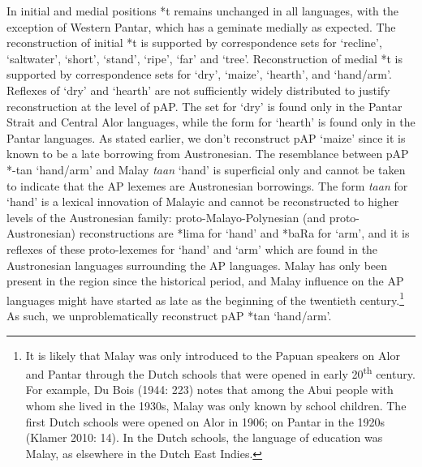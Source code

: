 In initial and medial positions *t remains unchanged in all languages, with the exception of Western Pantar, which has a geminate medially as expected. The reconstruction of initial *t is supported by correspondence sets for {\textquoteleft}recline{\textquoteright}, {\textquoteleft}saltwater{\textquoteright}, {\textquoteleft}short{\textquoteright}, {\textquoteleft}stand{\textquoteright}, {\textquoteleft}ripe{\textquoteright}, {\textquoteleft}far{\textquoteright} and {\textquoteleft}tree{\textquoteright}. Reconstruction of medial *t is supported by correspondence sets for {\textquoteleft}dry{\textquoteright}, {\textquoteleft}maize{\textquoteright}, {\textquoteleft}hearth{\textquoteright}, and {\textquoteleft}hand/arm{\textquoteright}. Reflexes of {\textquoteleft}dry{\textquoteright} and {\textquoteleft}hearth{\textquoteright} are not sufficiently widely distributed to justify reconstruction at the level of pAP. The set for {\textquoteleft}dry{\textquoteright} is found only in the Pantar Strait and Central 
Alor languages, while the form for {\textquoteleft}hearth{\textquoteright} is found only in the Pantar languages. As stated earlier, we don{\textquoteright}t reconstruct pAP {\textquoteleft}maize{\textquoteright} since it is known to be a late borrowing from Austronesian. The resemblance between pAP *-tan {\textquoteleft}hand/arm{\textquoteright} and Malay \textit{ta}\textit{{\ng}}\textit{an} {\textquoteleft}hand{\textquoteright} is superficial only and cannot be taken to indicate that the AP lexemes are Austronesian borrowings. The form \textit{ta}\textit{{\ng}}\textit{an} for {\textquoteleft}hand{\textquoteright} is a lexical innovation of Malayic and cannot be reconstructed to higher levels of the Austronesian family: proto-Malayo-Polynesian (and proto-Austronesian) reconstructions are *lima for {\textquoteleft}hand{\textquoteright} and *baRa for {\textquoteleft}arm{\textquoteright}, and it is reflexes of these proto-lexemes for {\textquoteleft}hand{\textquoteright} and {\textquoteleft}arm{\textquoteright}
 which are found in the Austronesian languages surrounding the AP languages. Malay has only been present in the region since the historical period, and Malay influence on the AP languages might have started as late as the beginning of the twentieth century.\footnote{ It is likely that Malay was only introduced to the Papuan speakers on Alor and Pantar through the Dutch schools that were opened in early 20\textsuperscript{th} century. For example, Du Bois (1944: 223) notes that among the Abui people with whom she lived in the 1930s, Malay was only known by school children. The first Dutch schools were opened on Alor in 1906; on Pantar in the 1920s (Klamer 2010: 14). In the Dutch schools, the language of education was Malay, as elsewhere in the Dutch East Indies.} As such, we unproblematically reconstruct pAP *tan {\textquoteleft}hand/arm{\textquoteright}.

